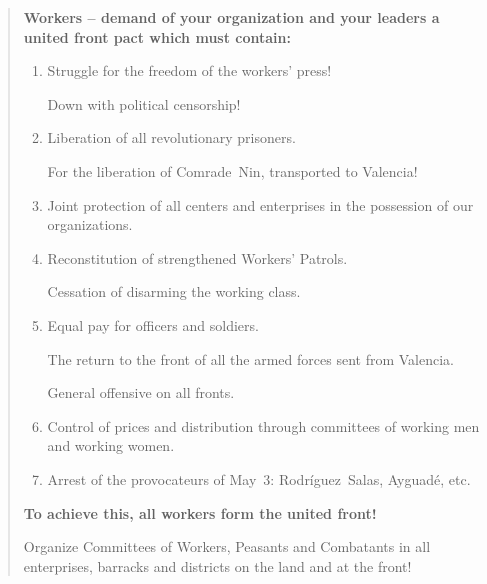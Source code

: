 \medskip

\begin{oframed}
  \begin{quote}
  	\flushleft
  	
  	\medskip
  	
  	\textbf{Workers -- demand of your organization and your leaders a united front pact which must contain:}
  
    \smallskip
    
    \FlushLeft %
  
    \begin{enumerate}[leftmargin=2em, labelindent=0.5em, itemindent=-1em]
      \item Struggle for the freedom of the workers’ press!
      
      Down with political censorship!
      
      \item Liberation of all revolutionary prisoners.
      
      For the liberation of Comrade~Nin,{\indexANin} transported to Valencia!
      
      \item Joint protection of all centers and enterprises in the possession of our organizations.
      
      \item Reconstitution of strengthened Workers’ Patrols.
      
      Cessation of disarming the working class.
      
      \item Equal pay for officers and soldiers.
      
      The return to the front of all the armed forces sent from Valencia.
      
      General offensive on all fronts.
      
      \item Control of prices and distribution through committees of working men and working women.
      
      \item Arrest of the provocateurs of May~3: Rodr\'iguez~Salas, Ayguad\'e, etc.
    \end{enumerate}
  
    \textbf{To achieve this, all workers form the united front!}
    
    Organize Committees of Workers, Peasants and Combatants in all enterprises, barracks and districts on the land and at the front!
    
    \medskip
  \end{quote}
\end{oframed}

